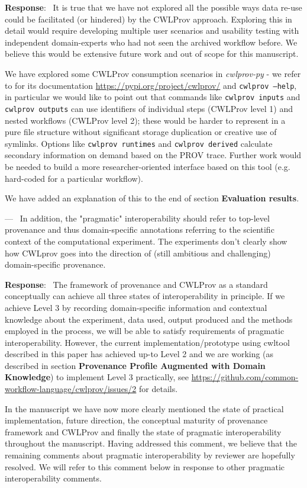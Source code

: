 \documentclass[11pt]{article}
\newcounter{reviewer}
\newcounter{point}[reviewer]
\renewcommand{\thepoint}{P\,\thereviewer.\arabic{point}}
\newenvironment{point}
   {\refstepcounter{point} \bigskip \noindent {\textbf{Reviewer~Point~\thepoint} } ---\ }
   {\par }
\newenvironment{reply}
   {\medskip \noindent \begin{sf}\textbf{Response}:\ \color{blue} }
   {\medskip \end{sf}}
\begin{document}
\begin{reply} 
It is true that we have not explored all the possible ways data re-use could be facilitated (or hindered) by the CWLProv approach. Exploring this in detail would require developing multiple user scenarios and usability testing with independent domain-experts who had not seen the archived workflow before. We believe this would be extensive future work and out of scope for this manuscript. 

We have explored some CWLProv consumption scenarios in \textit{cwlprov-py} - we refer to for its documentation \url{https://pypi.org/project/cwlprov/} and \texttt{cwlprov --help}, in particular we would like to point out that commands like \texttt{cwlprov inputs} and \texttt{cwlprov outputs} can use identifiers of individual steps (CWLProv level 1) and nested workflows (CWLProv level 2); these would be harder to represent in a pure file structure without significant storage duplication or creative use of symlinks. Options like \texttt{cwlprov runtimes} and \texttt{cwlprov derived} calculate secondary information on demand based on the PROV trace. Further work would be needed to build a more researcher-oriented interface  based on this tool (e.g. hard-coded for a particular workflow).

We have added an explanation of this to the end of section \textbf{Evaluation results}.
\end{reply}

\begin{point}
 In addition, the "pragmatic" interoperability should refer to top-level provenance and thus domain-specific annotations referring to the scientific context of the computational experiment. The experiments don't clearly show how CWLprov goes into the direction of (still ambitious and challenging) domain-specific provenance. 
    \label{pt:pragmatic}
\end{point}

\begin{reply} 
	The framework of provenance and CWLProv as a standard conceptually can achieve all three states of interoperability in principle. If we achieve Level 3 by recording domain-specific information and contextual knowledge about the experiment, data used, output produced and the methods employed in the process, we will be able to satisfy requirements of pragmatic interoperability. However, the current implementation/prototype using cwltool described in this paper has achieved up-to Level 2 and we are working (as described in section \textbf{Provenance Profile Augmented with Domain Knowledge}) to implement Level 3 practically, see  \url{https://github.com/common-workflow-language/cwlprov/issues/2}  for details.
	
	In the manuscript we have now more clearly mentioned the state of practical implementation, future direction, the conceptual maturity of provenance framework and CWLProv and finally the state of pragmatic interoperability throughout the manuscript. Having addressed this comment, we believe that the remaining comments about pragmatic interoperability by reviewer are hopefully resolved. We will refer to this comment below in response to other pragmatic interoperability comments. 
\end{reply}
\end{document}
